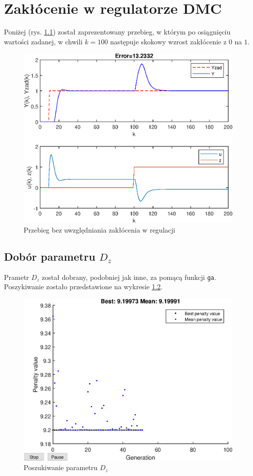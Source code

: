 \chapter{Zakłócenie w regulatorze DMC}
\label{zad5}
Poniżej (rys. \ref{fig:zak_bezr}) został zaprezentowany przebieg, w którym po osiągnięciu wartości zadanej, w chwili $k=100$ następuje skokowy wzrost zakłócenie z $0$ na $1$.

\begin{figure}[h!]
	\centering
	\includegraphics[scale=1]{Rys/zak_bezr.eps}
	\caption{Przebieg bez uwzględniania zakłócenia w regulacji}
	\label{fig:zak_bezr}
\end{figure}

\section{Dobór parametru $D_z$}
Prametr $D_z$ został dobrany, podobniej jak inne, za pomącą funkcji \verb|ga|. Poszykiwanie zostało przedstawione na wykresie \ref{fig:stojenie_dz}.

\begin{figure}[h!]
	\centering
	\includegraphics[scale=1]{Rys/strojenie_dz.eps}
	\caption{Poszukiwanie parametru $D_z$}
	\label{fig:stojenie_dz}
\end{figure}

